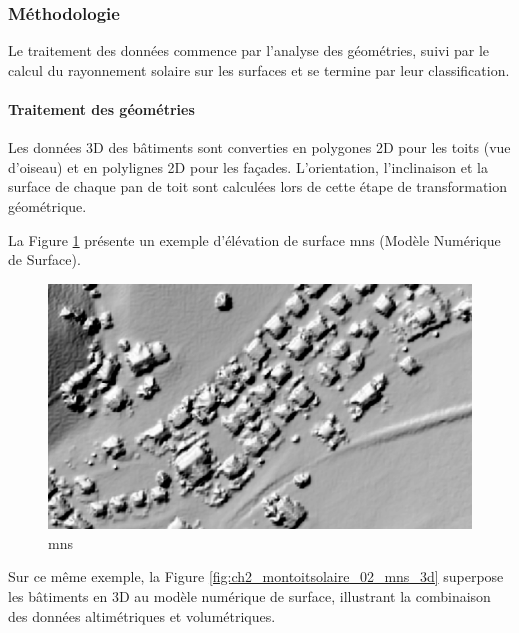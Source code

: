 \subsubsection{Méthodologie}
\par{Le traitement des données commence par l'analyse des géométries, suivi par le calcul du rayonnement solaire sur les surfaces et se termine par leur classification.}

\paragraph{Traitement des géométries}

Les données 3D des bâtiments sont converties en polygones 2D pour les toits (vue d'oiseau) et en polylignes 2D pour les façades. L'orientation, l'inclinaison et la surface de chaque pan de toit sont calculées lors de cette étape de transformation géométrique.

La Figure \ref{fig:ch2_montoitsolaire_01_mns} présente un exemple d'élévation de surface \acrshort{mns} (Modèle Numérique de Surface).

\begin{figure}[H]
    \centering
    \includegraphics[width=1\linewidth]{02-main//figures/ch2/ch2_montoitsolaire_01_mns.png}
    \caption{\acrshort{mns} \cite{bfe_wie_nodate}}
    \label{fig:ch2_montoitsolaire_01_mns}
\end{figure}

Sur ce même exemple, la Figure \ref{fig:ch2_montoitsolaire_02_mns_3d} superpose les bâtiments en 3D au modèle numérique de surface, illustrant la combinaison des données altimétriques et volumétriques.

